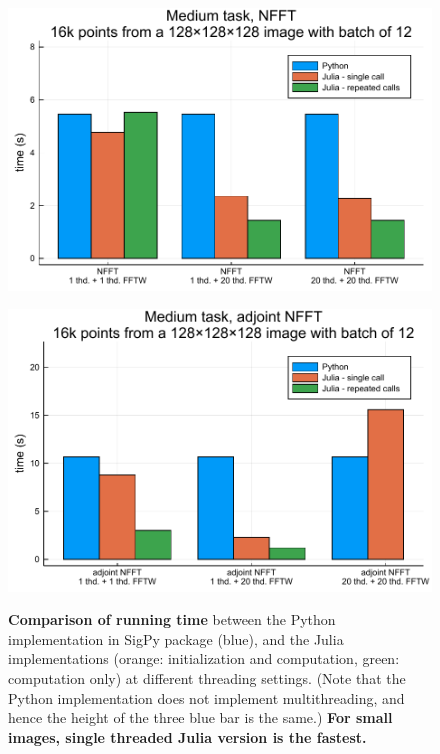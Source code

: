 \begin{figure}
    \centering
    \begin{minipage}{0.48\linewidth}
        \centering
        \includegraphics[width=\linewidth]{images/nfft_medium_forw.pdf}
        \label{fig:nfft_medium_forw}
    \end{minipage}
    \begin{minipage}{0.48\linewidth}
        \centering
        \includegraphics[width=\linewidth]{images/nfft_medium_backw.pdf}
        \label{fig:nfft_medium_backw}
    \end{minipage}
    \caption{\textbf{Comparison of running time} between the Python implementation in SigPy package (blue), and the Julia implementations (orange: initialization and computation, green: computation only) at different threading settings. (Note that the Python implementation does not implement multithreading, and hence the height of the three blue bar is the same.) \textbf{For small images, single threaded Julia version is the fastest.}}
    \label{fig:nfft_medium}
\end{figure}


